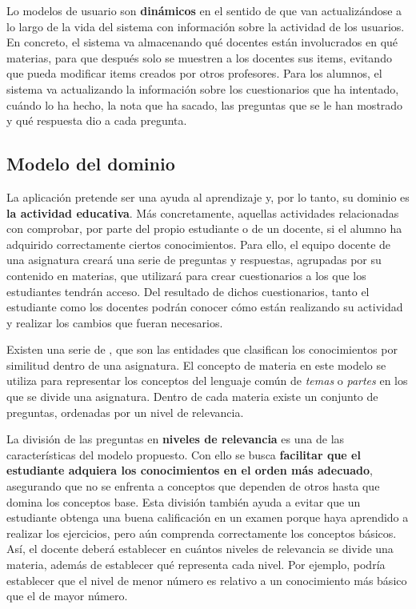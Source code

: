 Lo modelos de usuario son \textbf{dinámicos} en el sentido de que van  actualizándose a lo largo de la vida del sistema con información sobre la actividad de los usuarios. En concreto, el sistema va almacenando qué docentes están involucrados en qué materias, para que después solo se muestren a los docentes sus items, evitando que pueda modificar items creados por otros profesores. Para los alumnos, el sistema va actualizando la información sobre los cuestionarios que ha intentado, cuándo lo ha hecho, la nota que ha sacado, las preguntas que se le han mostrado y qué respuesta dio a cada pregunta.

\subsection{Modelo del dominio}

La aplicación pretende ser una ayuda al aprendizaje y, por lo tanto, su dominio es \textbf{la actividad educativa}. Más concretamente, aquellas actividades relacionadas con comprobar, por parte del propio estudiante o de un docente, si el alumno ha adquirido correctamente ciertos conocimientos. Para ello, el equipo docente de una asignatura creará una serie de preguntas y respuestas, agrupadas por su contenido en materias, que utilizará para crear cuestionarios a los que los estudiantes tendrán acceso. Del resultado de dichos cuestionarios, tanto el estudiante como los docentes podrán conocer cómo están realizando su actividad y realizar los cambios que fueran necesarios.

Existen una serie de , que son las entidades que clasifican los conocimientos por similitud dentro de una asignatura. El concepto de materia en este modelo se utiliza para representar los conceptos del lenguaje común de \emph{temas} o \emph{partes} en los que se divide una asignatura. Dentro de cada materia existe un conjunto de preguntas, ordenadas por un nivel de relevancia.

La división de las preguntas en \textbf{niveles de relevancia} es una de las características del modelo propuesto. Con ello se busca \textbf{facilitar que el estudiante adquiera los conocimientos en el orden más adecuado}, asegurando que no se enfrenta a conceptos que dependen de otros hasta que domina los conceptos base. Esta división también ayuda a evitar que un estudiante obtenga una buena calificación en un examen porque haya aprendido a realizar los ejercicios, pero aún comprenda correctamente los conceptos básicos. Así, el docente deberá establecer en cuántos niveles de relevancia se divide una materia, además de establecer qué representa cada nivel. Por ejemplo, podría establecer que el nivel de menor número es relativo a un conocimiento más básico que el de mayor número.

